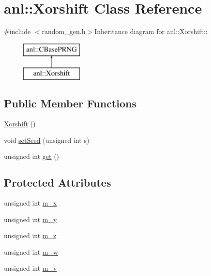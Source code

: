 \hypertarget{classanl_1_1Xorshift}{
\section{anl::Xorshift Class Reference}
\label{classanl_1_1Xorshift}
}


{\ttfamily \#include $<$random\_\-gen.h$>$}Inheritance diagram for anl::Xorshift::\begin{figure}[H]
\begin{center}
\leavevmode
\includegraphics[height=2cm]{classanl_1_1Xorshift}
\end{center}
\end{figure}
\subsection*{Public Member Functions}
\begin{DoxyCompactItemize}
\item 
\hyperlink{classanl_1_1Xorshift_ad975d9a90cfc1c46132dfc4262a148a6}{Xorshift} ()
\item 
void \hyperlink{classanl_1_1Xorshift_a0fd07695b4ac9d214db30ce5f896f958}{setSeed} (unsigned int s)
\item 
unsigned int \hyperlink{classanl_1_1Xorshift_a4077fd48d3a6dd1a57a6aa3089441dd7}{get} ()
\end{DoxyCompactItemize}
\subsection*{Protected Attributes}
\begin{DoxyCompactItemize}
\item 
unsigned int \hyperlink{classanl_1_1Xorshift_ad6be1c89d19dd0567d0ca37ae101c656}{m\_\-x}
\item 
unsigned int \hyperlink{classanl_1_1Xorshift_a1bf9c4d775f36023dbf81508f86f8d79}{m\_\-y}
\item 
unsigned int \hyperlink{classanl_1_1Xorshift_ad282813f3e294213111efd317f994f0e}{m\_\-z}
\item 
unsigned int \hyperlink{classanl_1_1Xorshift_af5ba3ea5124f4f83bc0f7b2bb6e4abbf}{m\_\-w}
\item 
unsigned int \hyperlink{classanl_1_1Xorshift_ab37edafc9c8345410e491bf36e27b0dd}{m\_\-v}
\end{DoxyCompactItemize}


